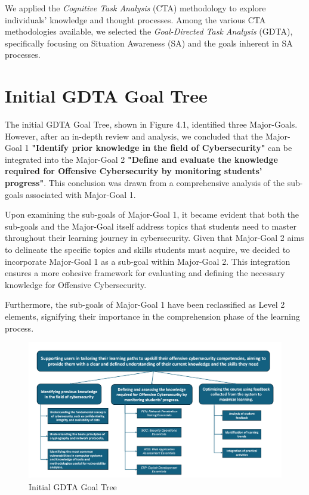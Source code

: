 We applied the \textit{Cognitive Task Analysis} (CTA) methodology to explore individuals' knowledge and thought processes. Among the various CTA methodologies available, we selected the \textit{Goal-Directed Task Analysis} (GDTA), specifically focusing on Situation Awareness (SA) and the goals inherent in SA processes. 

\section{Initial GDTA Goal Tree}
The initial GDTA Goal Tree, shown in Figure 4.1, identified three Major-Goals. However, after an in-depth review and analysis, we concluded that the Major-Goal 1 \textbf{"Identify prior knowledge in the field of Cybersecurity"} can be integrated into the Major-Goal 2 \textbf{"Define and evaluate the knowledge required for Offensive Cybersecurity by monitoring students' progress"}. This conclusion was drawn from a comprehensive analysis of the sub-goals associated with Major-Goal 1.

Upon examining the sub-goals of Major-Goal 1, it became evident that both the sub-goals and the Major-Goal itself address topics that students need to master throughout their learning journey in cybersecurity. Given that Major-Goal 2 aims to delineate the specific topics and skills students must acquire, we decided to incorporate Major-Goal 1 as a sub-goal within Major-Goal 2. This integration ensures a more cohesive framework for evaluating and defining the necessary knowledge for Offensive Cybersecurity. 

Furthermore, the sub-goals of Major-Goal 1 have been reclassified as Level 2 elements, signifying their importance in the comprehension phase of the learning process. 

\begin{figure}[H]
    \centering
    \includegraphics[width=\textwidth]{./assets/initialgdta.png}
    \caption{Initial GDTA Goal Tree}
    \label{fig:Initial GDTA}
\end{figure}

